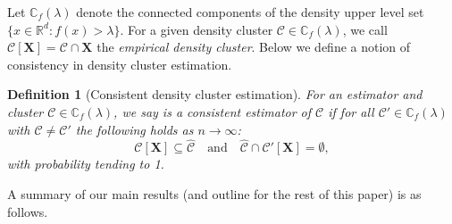 \documentclass{article}
\newcommand{\Reals}{\mathbb{R}}
\newcommand{\Rd}{\Reals^d}
\newcommand{\1}{\mathbf{1}}
\newcommand{\Xbf}{\mathbf{X}}
\newcommand{\Cbb}{\mathbb{C}}
\newcommand{\Cset}{\mathcal{C}}
\theoremstyle{aldenthm}
\newtheorem{definition}{Definition}
\theoremstyle{aldenrmrk}
\begin{document}



Let $\Cbb_f(\lambda)$ denote the connected components of the density upper level
set $\{x \in \Rd: f(x) > \lambda\}$.  For a given density cluster $\Cset \in
\Cbb_f(\lambda)$, we call $\Cset[\Xbf] = \Cset \cap \Xbf$ the \emph{empirical
  density cluster}. Below we define a notion of consistency in density cluster
estimation.     

\begin{definition}[Consistent density cluster estimation]
\label{def: consistent_density_cluster_estimation}
For an estimator \smash{$\widehat{\Cset} \subseteq \Xbf$} and cluster 
$\Cset \in \Cbb_f(\lambda)$, we say \smash{$\widehat{\Cset}$} is a consistent
estimator of $\Cset$ if for all $\Cset' \in \Cbb_f(\lambda)$ with $\Cset \not=
\Cset'$ the following holds as $n \to \infty$: 
\begin{equation}
\label{eqn: consistent_density_cluster_recovery}
\Cset[\Xbf] \subseteq \widehat{\Cset} \quad \text{and} \quad
\widehat{\Cset} \cap \Cset'[\Xbf] = \emptyset,
\end{equation}
with probability tending to 1.
\end{definition}

A summary of our main results (and outline for the rest of this paper) is as
follows.  
\end{document}
